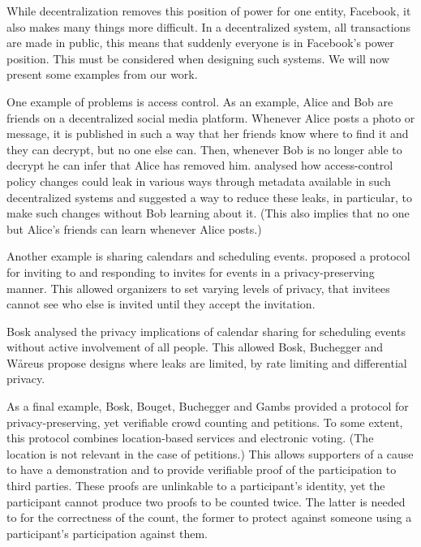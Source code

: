 While decentralization removes this position of power for one entity, \eg 
Facebook, it also makes many things more difficult.
In a decentralized system, all transactions are made in public, this means that 
suddenly everyone is in Facebook's power position.
This must be considered when designing such systems.
We will now present some examples from our work.

One example of problems is access control.
As an example, Alice and Bob are friends on a decentralized social media 
platform.
Whenever Alice posts a photo or message, it is published in such a way that her 
friends know where to find it and they can decrypt, but no one else can.
Then, whenever Bob is no longer able to decrypt he can infer that Alice has 
removed him.
\Textcite{PPACinPubFS} analysed how access-control policy changes could leak in 
various ways through metadata available in such decentralized systems and 
suggested a way to reduce these leaks, in particular, to make such changes 
without Bob learning about it.
(This also implies that no one but Alice's friends can learn whenever Alice 
posts.)

Another example is sharing calendars and scheduling events.
\Textcite{EventsInvitations} proposed a protocol for inviting to and responding 
to invites for events in a privacy-preserving manner.
This allowed organizers to set varying levels of privacy, \eg that invitees 
cannot see who else is invited until they accept the invitation.

Bosk analysed the privacy implications of calendar sharing for scheduling 
events without active involvement of all people.
This allowed Bosk, Buchegger and Wåreus propose designs where leaks are 
limited, \eg by rate limiting and differential privacy.

As a final example, Bosk, Bouget, Buchegger and Gambs provided a protocol for 
privacy-preserving, yet verifiable crowd counting and petitions.
To some extent, this protocol combines location-based services and electronic 
voting.
(The location is not relevant in the case of petitions.)
This allows supporters of a cause to have a demonstration and to provide 
verifiable proof of the participation to third parties.
These proofs are unlinkable to a participant's identity, yet the participant 
cannot produce two proofs to be counted twice.
The latter is needed to for the correctness of the count, the former to protect 
against someone using a participant's participation against them.



\begin{frame}[allowframebreaks]
  \printbibliography
\end{frame}
